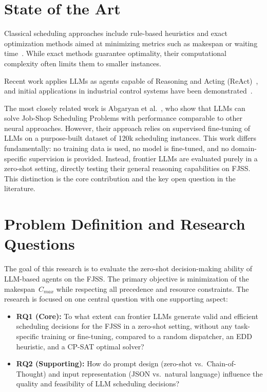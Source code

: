 \documentclass{article}
\begin{document}
\section{State of the Art}

Classical scheduling approaches include rule-based heuristics and exact optimization methods aimed at minimizing metrics such as makespan or waiting time~\cite[Chapter 3]{leungHandbookSchedulingAlgorithms2004}. While exact methods guarantee optimality, their computational complexity often limits them to smaller instances.

Recent work applies LLMs as agents capable of Reasoning and Acting (ReAct)~\cite{yaoREACSYNERGIZINGREASONING2022}, and initial applications in industrial control systems have been demonstrated~\cite{xiaControlIndustrialAutomation2025,vyasAutonomousIndustrialControl2024}.


The most closely related work is Abgaryan et al.~\cite{abgaryanLLMsCanSchedule2024}, who show that LLMs can solve Job-Shop Scheduling Problems with performance comparable to other neural approaches. However, their approach relies on supervised fine-tuning of LLMs on a purpose-built dataset of 120k scheduling instances. This work differs fundamentally: no training data is used, no model is fine-tuned, and no domain-specific supervision is provided. Instead, frontier LLMs are evaluated purely in a zero-shot setting, directly testing their general reasoning capabilities on FJSS. This distinction is the core contribution and the key open question in the literature.


\section{Problem Definition and Research Questions}

The goal of this research is to evaluate the zero-shot decision-making ability
of LLM-based agents on the FJSS. The primary objective is minimization of the
makespan~$C_{max}$ while respecting all precedence and resource constraints.
The research is focused on one central question with one supporting aspect:
 
\begin{itemize}
  \item \textbf{RQ1 (Core):} To what extent can frontier LLMs generate valid
    and efficient scheduling decisions for the FJSS in a zero-shot setting,
    without any task-specific training or fine-tuning, compared to a random
    dispatcher, an EDD heuristic, and a CP-SAT optimal solver?
  \item \textbf{RQ2 (Supporting):} How do prompt design (zero-shot
    vs.\ Chain-of-Thought) and input representation (JSON vs.\ natural
    language) influence the quality and feasibility of LLM scheduling
    decisions?
\end{itemize}
 
\end{document}
